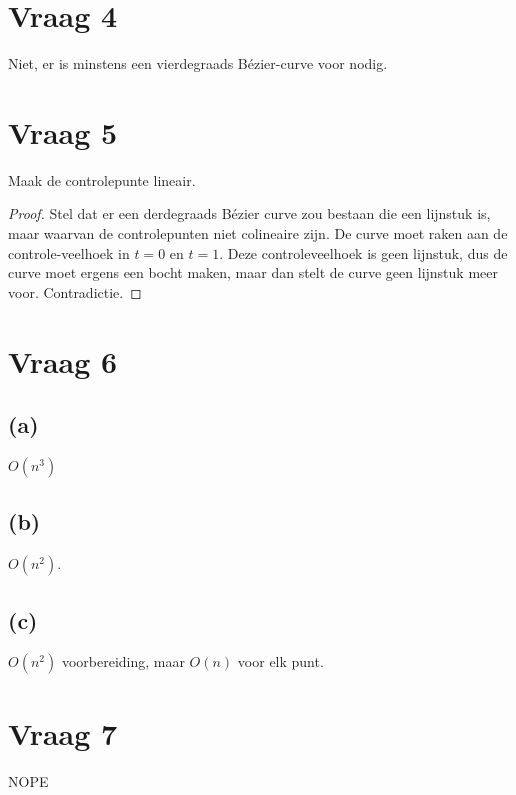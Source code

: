 \documentclass[10pt,a4paper]{article}
\begin{document}
\section{Vraag 4}
Niet, er is minstens een vierdegraads B\'ezier-curve voor nodig.

\section{Vraag 5}
Maak de controlepunte lineair.
\begin{proof}
Stel dat er een derdegraads B\'ezier curve zou bestaan die een lijnstuk is, maar waarvan de controlepunten niet colineaire zijn. De curve moet raken aan de controle-veelhoek in $t=0$ en $t=1$. Deze controleveelhoek is geen lijnstuk, dus de curve moet ergens een bocht maken, maar dan stelt de curve geen lijnstuk meer voor. Contradictie.
\end{proof}

\section{Vraag 6}
\subsection*{(a)}
$O(n^3)$

\subsection*{(b)}
$O(n^2)$.

\subsection*{(c)}
$O(n^2)$ voorbereiding, maar $O(n)$ voor elk punt.

\section{Vraag 7}
NOPE


\end{document}
